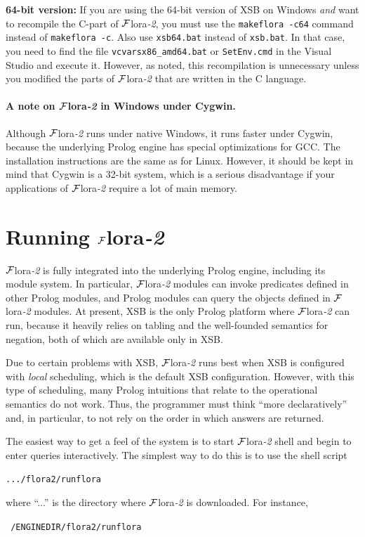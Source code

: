 \documentclass[11pt]{article}
\newcommand{\FLSYSTEM}{{\mbox{\sc ${\cal F}${lora}\rm\emph{-2}}}\xspace}
\newcommand{\ENGINENAME}{flora2}
\newcommand{\ENGINERUN}{runflora}
\begin{document}
{\noindent
\textbf{64-bit version:}  
If you are using the 64-bit version of XSB on Windows \emph{and} want to
recompile the C-part of
\FLSYSTEM, you must use the \texttt{makeflora -c64} command instead of
\texttt{makeflora -c}. Also use \texttt{xsb64.bat} instead of \texttt{xsb.bat}.
In that case, you need to find the file
\texttt{vcvarsx86\_amd64.bat} or \texttt{SetEnv.cmd} in the Visual Studio
and execute it.  
However, as noted, this recompilation is unnecessary unless you modified
the parts of \FLSYSTEM that are written in the C language.


\paragraph{A note on  \FLSYSTEM in Windows under Cygwin.}
Although \FLSYSTEM runs under native Windows, it runs faster under Cygwin,
because the underlying Prolog engine has special optimizations for GCC.
The installation instructions are the same as for Linux.
However, it should be kept in mind that
Cygwin is a 32-bit system, which is a serious disadvantage if your
applications of \FLSYSTEM require a lot of main memory.
}
{}


\section{Running \FLSYSTEM}\label{sec-running}

\FLSYSTEM is fully integrated into the underlying Prolog engine, including its
module system. In particular, \FLSYSTEM modules can invoke predicates defined in
other Prolog modules, and Prolog modules can query the objects defined in
\FLSYSTEM modules. At present, XSB is the only Prolog platform where \FLSYSTEM
can run, because it heavily relies on tabling and the well-founded
semantics for negation, both of which are available only in XSB.

Due to certain problems with XSB, \FLSYSTEM runs best when XSB is configured
with \emph{local} scheduling, which is the default XSB configuration.
However, with this type of scheduling, many Prolog intuitions that relate
to the operational semantics do not work. Thus, the programmer must think
``more declaratively'' and, in particular, to not rely on the 
order in which answers are returned.


\index{\ENGINERUN script}
\label{runflora-page}
The easiest way to get a feel of the system
is to start \FLSYSTEM shell and begin to enter queries interactively.
The simplest way to do this is to use the shell script
\begin{alltt}
 .../\ENGINENAME/\ENGINERUN  
\end{alltt}
where ``...'' is the directory where \FLSYSTEM is downloaded. For instance,
\begin{alltt}
 ~/ENGINEDIR/\ENGINENAME/\ENGINERUN  
\end{alltt}
\end{document}
